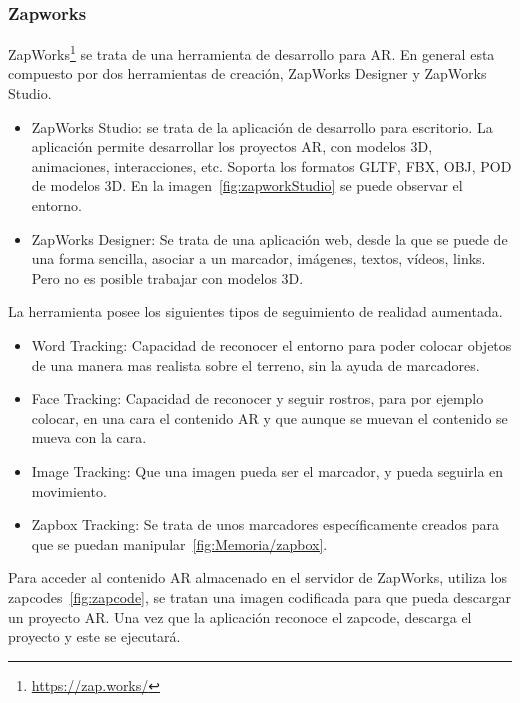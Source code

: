 \subsubsection{Zapworks} ZapWorks\footnote{\url{https://zap.works/}} se trata de una herramienta de desarrollo para AR. En general esta compuesto por dos herramientas de creación, ZapWorks Designer y ZapWorks Studio.

\begin{itemize}
	\item ZapWorks Studio: se trata de la aplicación de desarrollo para escritorio. La aplicación permite desarrollar los proyectos AR, con modelos 3D, animaciones, interacciones, etc. Soporta los formatos  GLTF, FBX, OBJ, POD de modelos 3D. En la imagen~\ref{fig:zapworkStudio} se puede observar el entorno.
	\item ZapWorks Designer: Se trata de una aplicación web, desde la que se puede de una forma sencilla, asociar a un marcador, imágenes, textos, vídeos, links. Pero no es posible trabajar con modelos 3D.
\end{itemize}	


La herramienta posee los siguientes tipos de seguimiento de realidad aumentada.

\begin{itemize}
	\item Word Tracking: Capacidad de reconocer el entorno para poder colocar objetos de una manera mas realista sobre el terreno, sin la ayuda de marcadores.
	\item Face Tracking: Capacidad de reconocer y seguir rostros, para por ejemplo colocar, en una cara el contenido AR y que aunque se muevan el contenido se mueva con la cara.
	\item Image Tracking: Que una imagen pueda ser el marcador, y pueda seguirla en movimiento.
	\item Zapbox Tracking: Se trata de unos marcadores específicamente creados para que se puedan manipular~\ref{fig:Memoria/zapbox}.
\end{itemize}


Para acceder al contenido AR almacenado en el servidor de ZapWorks, utiliza los zapcodes~\ref{fig:zapcode}, se tratan una imagen codificada para que pueda descargar un proyecto AR. Una vez que la aplicación reconoce el zapcode, descarga el proyecto y este se ejecutará.

